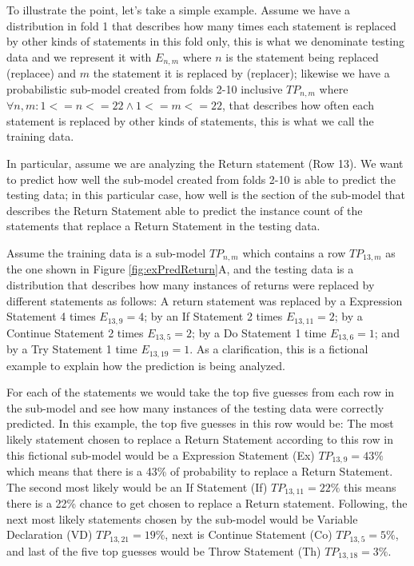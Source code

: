 \documentclass[conference]{IEEEtran}
\begin{document}
To illustrate the point, let's take a simple example. Assume we have a 
distribution in fold 1 that describes how many times each statement is replaced 
by other kinds of statements in this fold 
only, this is what we denominate testing data and we represent it with $E_{n,m}$ 
where $n$ is the statement being replaced (replacee) and $m$ the statement it is 
replaced by (replacer); likewise we have a probabilistic sub-model created from 
folds 2-10 inclusive $TP_{n,m}$ where $\forall n,m: 1<=n<=22 \land 1<=m<=22$, 
that describes how often each statement is replaced by 
other kinds of statements, this is what we call the training data. 

In 
particular, assume we are analyzing the Return statement (Row 13). We want to 
predict 
how well the sub-model created from folds 2-10 is able to predict the testing 
data; in this particular case, how well is the section of the sub-model that 
describes the Return Statement able to predict the instance count of the 
statements that replace a Return Statement in the testing data.

Assume the training data is a sub-model $TP_{n,m}$ which contains a row 
$TP_{13,m}$ as the one shown in Figure 
\ref{fig:exPredReturn}A, and the testing data is a distribution that describes 
how many instances of returns were replaced by different statements as follows: 
A return statement was replaced by a Expression Statement 4 times $E_{13,9} = 
4$; by an If 
Statement 2 times $E_{13,11} = 2$; by a Continue Statement 2 times $E_{13,5} = 
2$; by a Do Statement 1 time $E_{13,6} = 1$;
and by a Try Statement 1 time $E_{13,19} = 1$. As a clarification, this is a 
fictional example 
to explain how the prediction is being analyzed.

For each of the statements we would take the top five guesses from each row in 
the sub-model and see how many instances of the testing data were correctly 
predicted. In this example, the top five guesses in this row would be: The most 
likely statement chosen to replace a Return Statement according to this row in 
this fictional sub-model would be a Expression Statement (Ex) $TP_{13,9} = 43\%$ 
which means that there is a 43\% of probability to replace a Return Statement. 
The second most likely would be an If Statement (If) $TP_{13,11} = 22\%$ this 
means there is a 22\% chance to get chosen to replace a Return statement. 
Following, the next most likely statements chosen by the 
sub-model would be  Variable Declaration (VD)  $TP_{13,21} = 19\%$, next is 
Continue Statement (Co)  $TP_{13,5} = 5\%$, and last of the five top guesses 
would 
be Throw Statement (Th) $TP_{13,18} = 3\%$.
\end{document}
